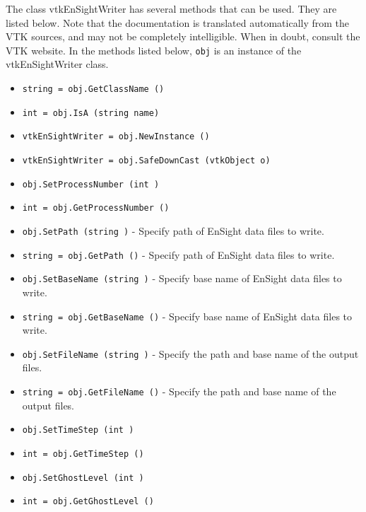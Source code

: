 The class vtkEnSightWriter has several methods that can be used.
  They are listed below.
Note that the documentation is translated automatically from the VTK sources,
and may not be completely intelligible.  When in doubt, consult the VTK website.
In the methods listed below, \verb|obj| is an instance of the vtkEnSightWriter class.
\begin{itemize}
\item  \verb|string = obj.GetClassName ()|

\item  \verb|int = obj.IsA (string name)|

\item  \verb|vtkEnSightWriter = obj.NewInstance ()|

\item  \verb|vtkEnSightWriter = obj.SafeDownCast (vtkObject o)|

\item  \verb|obj.SetProcessNumber (int )|

\item  \verb|int = obj.GetProcessNumber ()|

\item  \verb|obj.SetPath (string )| -  Specify path of EnSight data files to write.

\item  \verb|string = obj.GetPath ()| -  Specify path of EnSight data files to write.

\item  \verb|obj.SetBaseName (string )| -  Specify base name of EnSight data files to write.

\item  \verb|string = obj.GetBaseName ()| -  Specify base name of EnSight data files to write.

\item  \verb|obj.SetFileName (string )| -  Specify the path and base name of the output files.

\item  \verb|string = obj.GetFileName ()| -  Specify the path and base name of the output files.

\item  \verb|obj.SetTimeStep (int )|

\item  \verb|int = obj.GetTimeStep ()|

\item  \verb|obj.SetGhostLevel (int )|

\item  \verb|int = obj.GetGhostLevel ()|


\end{itemize}
